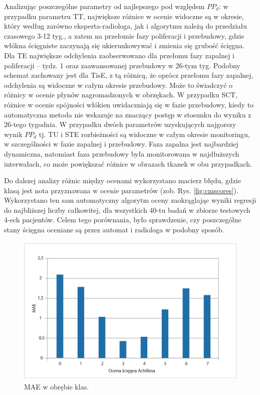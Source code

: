 Analizując poszczególne parametry od najlepszego pod względem $PP_d$: w przypadku parametru TT, największe różnice w ocenie widoczne są w okresie, który według zarówno eksperta-radiologa, jak i algorytmu należą do przedziału czasowego 3-12 tyg., a zatem na przełomie fazy poliferacji i przebudowy, gdzie włókna ścięgniste zaczynają się ukierunkowywać i zmienia się grubość ścięgna. Dla TE największe odchylenia zaobserwowano dla przełomu fazy zapalnej i poliferacji -- tydz. 1 oraz zaawansowanej przebudowy w 26-tym tyg. Podobny schemat zachowany jest dla TisE, \linebreak z tą różnicą, że oprócz przełomu fazy zapalnej, odchylenia są widoczne w całym okresie przebudowy. Może to świadczyć o różnicy w ocenie płynów nagromadzonych w obrzękach. W przypadku SCT, różnice w ocenie spójności włókien uwidaczniają się w fazie przebudowy, kiedy to automatyczna metoda nie wskazuje na znaczący postęp w stosunku do wyniku z 26-tego tygodnia. W przypadku dwóch parametrów uzyskujących najgorszy wynik $PP_d$ tj. TU i STE rozbieżności są widoczne w całym okresie monitoringu, w szczególności w fazie zapalnej i przebudowy. Faza zapalna jest najbardziej dynamiczna, natomiast faza przebudowy była monitorowana w najdłuższych interwałach, co może powiększać różnice w obrazach tkanek \linebreak w obu przypadkach. 

Do dalszej analizy różnic między ocenami wykorzystano macierz błędu, gdzie klasą jest nota przyznawana w ocenie parametrów (zob. Rys. \ref{fig:cmscores}). Wykorzystano ten sam automatyczny algorytm oceny zaokrąglając wyniki regresji do najbliższej liczby całkowitej, dla wszystkich 40-tu badań w zbiorze testowych 4-ech pacjentów. Celem tego porównania, było sprawdzenie, czy poszczególne stany ścięgna oceniane są przez automat i radiologa w podobny sposób.

\begin{figure}[t!]
	\centering
	\includegraphics[width=1\textwidth]{figures/cmScores_summary.jpg}
	\caption{MAE w obrębie klas.}\label{fig:cmscores_summary}
\end{figure}

